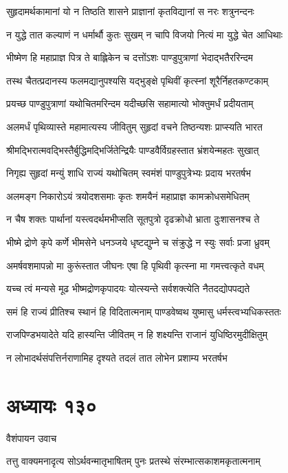 \twolineshloka
{सुहृदामर्थकामानां यो न तिष्ठति शासने}
{प्राज्ञानां कृतविद्यानां स नरः शत्रुनन्दनः}


\twolineshloka
{न युद्धे तात कल्याणं न धर्मार्थौ कुतः सुखम्}
{न चापि विजयो नित्यं मा युद्धे चेत आधिथाः}


\twolineshloka
{भीष्मेण हि महाप्राज्ञ पित्र ते बाह्लिकेन च}
{दत्तोंऽशः पाण्डुपुत्राणां भेदाद्भतैररिन्दम}


\twolineshloka
{तस्थ चैतत्प्रदानस्य फलमद्यानुपश्यसि}
{यद्भुङ्क्षे पृथिवीं कृत्स्नां शूरैर्निहतकण्टकाम्}


\twolineshloka
{प्रयच्छ पाण्डुपुत्राणां यथोचितमरिन्दम}
{यदीच्छसि सहामात्यो भोक्तुमर्धं प्रदीयताम्}


\twolineshloka
{अलमर्धं पृथिव्यास्ते महामात्यस्य जीवितुम्}
{सुहृदां वचने तिष्ठन्यशः प्राप्स्यति भारत}


\twolineshloka
{श्रीमद्भिरात्मवद्भिस्तैर्बुद्धिमद्भिर्जितेन्द्रियैः}
{पाण्डवैर्विग्रहस्तात भ्रंशयेन्महतः सुखात्}


\twolineshloka
{निगृह्य सुहृदां मन्युं शाधि राज्यं यथोचितम्}
{स्वमंशं पाण्डुपुत्रेभ्यः प्रदाय भरतर्षभ}


\twolineshloka
{अलमङ्ग निकारोऽयं त्रयोदशसमाः कृतः}
{शमयैनं महाप्राज्ञ कामक्रोधसमेधितम्}


\twolineshloka
{न चैष शक्तः पार्थानां यस्त्वदर्थमभीप्सति}
{सूतपुत्रो दृढक्रोधो भ्राता दुःशासनश्च ते}


\twolineshloka
{भीष्मे द्रोणे कृपे कर्णे भीमसेने धनञ्जये}
{धृष्टद्युम्ने च संक्रुद्धे न स्युः सर्वाः प्रजा ध्रुवम्}


\twolineshloka
{अमर्षवशमापन्नो मा कुरूंस्तात जीघनः}
{एषा हि पृथिवी कृत्स्ना मा गमत्त्वत्कृते वधम्}


\twolineshloka
{यच्च त्वं मन्यसे मूढ भीष्मद्रोणकृपादयः}
{योत्स्यन्ते सर्वशक्त्येति नैतदद्योपपद्यते}


\twolineshloka
{समं हि राज्यं प्रीतिश्च स्थानं हि विदितात्मनाम्}
{पाण्डवेष्वथ युष्मासु धर्मस्त्वभ्यधिकस्ततः}


\twolineshloka
{राजपिण्डभयादेते यदि हास्यन्ति जीवितम्}
{न हि शक्ष्यन्ति राजानं युधिष्ठिरमुदीक्षितुम्}


\twolineshloka
{न लोभादर्थसंपत्तिर्नराणामिह दृश्यते}
{तदलं तात लोभेन प्रशाम्य भरतर्षभ}


\chapter{अध्यायः १३०}
\twolineshloka
{वैशंपायन उवाच}
{}


\twolineshloka
{तत्तु वाक्यमनादृत्य सोऽर्थवन्मातृभाषितम्}
{पुनः प्रतस्थे संरम्भात्सकाशमकृतात्मनाम्}


